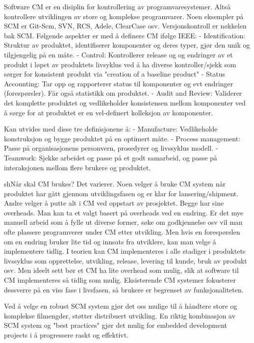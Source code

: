 Software CM er en disiplin for kontrollering av programvaresystemer. Altså kontrollere utviklingen av store og komplekse programvarer. Noen eksempler på SCM er Git-Scm, SVN, RCS, Adele, ClearCase osv. Versjonskontroll er nøkkelen bak SCM. Følgende aspekter er med å definere CM ifølge IEEE:
-	Identification: Struktur av produktet, identifiserer komponenter og deres typer, gjør den unik og tilgjengelig på en måte.
-	Control: Kontrollerer release og og endringer av et produkt i løpet av produktets livsyklus ved å ha diverse kontroller/sjekk som sørger for konsistent produkt via "creation of a baseline product"
-	Status Accounting: Tar opp og rapporterer status til komponenter og evt endringer (forespørsler). Får også  statistikk om produktet.
-	Audit and Review: Validerer det komplette produktet og vedlikeholder konsistensen mellom komponenter ved å sørge for at produktet er en vel-definert kolleksjon av komponenter.

Kan utvides med disse tre definisjonene å:
-	Manufacture: Vedlikeholde konstruksjon og bygge produktet på en optimert måte. 
-	Process management: Passe på organisasjonens personvern, prosedyrer og livssyklus modell.
-	Teamwork: Sjekke arbeidet og passe på et godt samarbeid, og passe på interaksjonen mellom flere brukere og produktet.

shNår skal CM brukes? Det varierer. Noen velger å bruke CM system når produktet har gått gjennom utviklingsfasen og er klar for lansering/shipment. Andre velger å putte alt i CM ved oppstart av prosjektet. Begge har sine overheads. Man kan ta et valgt basert på overheads ved en endring. Er det mye manuell arbeid som å fylle ut diverse former, søke om godkjennelse osv vil man ofte plassere programverer under CM etter utvikling. Men hvis en forespørslen om en endring bruker lite tid og innsats fra utviklere, kan man velge å implementere tidlig. I teorien kan CM implementeres i alle stadiger i produktets livssyklus som opprettelse, utvikling, release, levering til kunde, bruk av produkt osv. Men ideelt sett bør et CM ha lite overhead som mulig, slik at software til CM implementeres så tidlig som mulig. Eksisterende CM systemer fokusterer dessverre på en viss fase i livsfasen, så brukere er begrenset av funksjonaliteten.



Ved å velge en robust SCM system gjør det oss mulige til å håndtere store og komplekse filmengder, støtter distribuert utvikling. En riktig kombinasjon av SCM system og "best practices" gjør det mulig for embedded development projects i å progressere raskt og effektivt.


